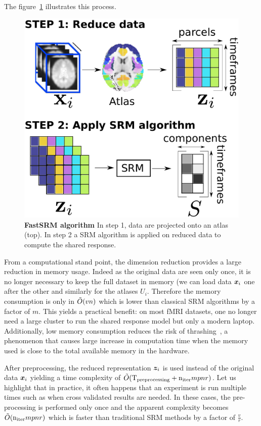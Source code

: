 The figure~\ref{fig:srm:conceptual} illustrates this process.
\begin{figure}
  \centering
  \includegraphics[scale=0.34]{figures/srm/conceptual_figure2.pdf}
  \caption{\textbf{FastSRM algorithm} In step 1, data are projected onto an atlas (top). In step 2 a SRM algorithm is applied on reduced data to compute the shared response.}
  \label{fig:srm:conceptual}
\end{figure}

From a computational stand point, the dimension reduction provides
a large reduction in memory usage. Indeed as the original data are seen only
once, it is no longer necessary to keep the full dataset in memory (we can load
data $\boldsymbol{x}_i$ one after the other and similarly for the atlases $U_i$. Therefore the memory consumption is only in $\tilde{O}(vn)$ which is lower than classical SRM algorithms by a factor of $m$. This yields a practical benefit: on most fMRI datasets, one no longer need a large cluster to run the shared response model but only a modern laptop.
Additionally, low memory consumption reduces the
risk of thrashing~\cite{denning1968thrashing}, a phenomenon that causes large
increase in computation time when the memory used is close to the total available
memory in the hardware.

After preprocessing, the reduced representation $\boldsymbol{z}_i$ is used instead of the
original data $\boldsymbol{x}_i$ yielding a time complexity of $\tilde{O}(
\mathrm{T_{preprocessing}} + \mathrm{n_{iter}} mpnr)$.
Let us highlight that in practice, it often happens that an experiment is run
multiple times such as when cross validated results are needed. In these cases,
the pre-processing is performed only once and the apparent complexity becomes
$\tilde{O}(\mathrm{n_{iter}} mpnr)$ which is faster than traditional SRM methods by
a factor of $\frac{v}{r}$.

